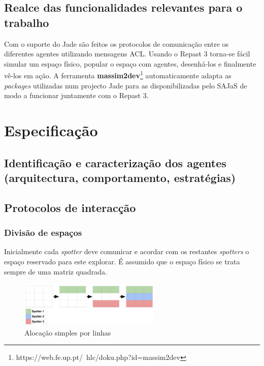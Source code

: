 \documentclass[12pt]{report}
\begin{document}
\section{Realce das funcionalidades relevantes para o trabalho}

Com o suporte do Jade são feitos os protocolos de comunicação entre os diferentes agentes utilizando mensagens ACL. Usando o Repast 3 torna-se
fácil simular um espaço físico, popular o espaço com agentes, desenhá-los e finalmente vê-los em ação.
A ferramenta \textbf{massim2dev}\footnote{https://web.fe.up.pt/~hlc/doku.php?id=massim2dev} automaticamente adapta as \textit{packages} utilizadas num
projecto Jade para as disponibilizadas pelo SAJaS de modo a funcionar juntamente com o Repast 3.


\chapter{Especificação}
\section{Identificação e caracterização dos agentes (arquitectura, comportamento, estratégias)}

\section{Protocolos de interacção}

\subsection{Divisão de espaços}
Inicialmente cada \emph{spotter} deve comunicar e acordar com os restantes \emph{spotters} o espaço reservado para este explorar.
É assumido que o espaço físico se trata sempre de uma matriz quadrada.

\begin{figure}[h]
  \centering
    \includegraphics[width=0.6\textwidth]{spotter-spaces}
  \caption{\small{Alocação simples por linhas}}
\end{figure}
\end{document}
